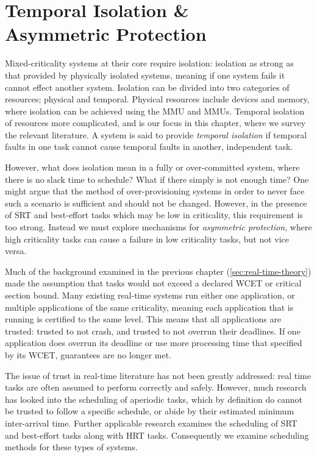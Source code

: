 \chapter{Temporal Isolation \& \\ Asymmetric Protection}
\label{chap:scheduling}

Mixed-criticality systems at their core require isolation: isolation as strong as that provided by
physically isolated systems, meaning if one system fails it cannot effect another system.  Isolation
can be divided into two categories of resources; physical and temporal. Physical resources include 
devices and memory, where isolation can be achieved using the \gls{MMU} and \IO\glspl{MMU}.
Temporal isolation of resources more complicated, and is our focus in this chapter, where
we survey the relevant literature.
A system is said to provide \emph{temporal isolation} if temporal faults in one task cannot cause
temporal faults in another, independent task. 

However, what does isolation mean in a fully or over-committed system, where there is no slack time 
to schedule? What if there simply is not enough time? One might argue that the method of
over-provisioning systems in order to never face such a scenario is sufficient and should not be
changed. However, in the presence of \gls{SRT} and best-effort tasks which may be low in
criticality, this requirement is too strong. Instead we must explore mechanisms for \emph{asymmetric
protection}, where high criticality tasks can cause a failure in low criticality tasks, but not vice
versa.

Much of the background examined in the previous chapter (\cref{sec:real-time-theory})
made the assumption that tasks would not exceed a declared \gls{WCET} or critical section bound. 
Many existing real-time systems run either one application, or multiple applications of the same
criticality, meaning each application that is running is certified to the same level.  This means
that all applications are trusted: trusted to not crash, and trusted to not overrun their deadlines.
If one application does overrun its deadline or use more processing time that specified by its
\gls{WCET}, guarantees are no longer met. 

The issue of trust in real-time literature has not been greatly addressed: real time tasks are often
assumed to perform correctly and safely.  However, much research has looked into the scheduling of
aperiodic tasks, which by definition do cannot be trusted to follow a specific schedule, or abide by
their estimated minimum inter-arrival time. Further applicable research examines the scheduling of
\gls{SRT} and best-effort tasks along with \gls{HRT} tasks. Consequently we examine scheduling methods for
these types of systems. 

